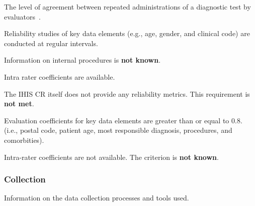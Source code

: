 The level of agreement between repeated administrations of a diagnostic test by evaluators~\cite{kilem2008}.

\begin{QandA}
    \item Reliability studies of key data elements (e.g., age, gender, and clinical code) are conducted at regular intervals.
    \begin{answered}
        Information on internal procedures is \textbf{not known}.
    \end{answered}

    \item Intra rater coefficients are available.
    \begin{answered}
        The IHIS CR itself does not provide any reliability metrics.
        This requirement is \textbf{not met}.
    \end{answered}

    \item Evaluation coefficients for key data elements are greater than or equal to 0.8. (i.e., postal code, patient age, most responsible diagnosis, procedures, and comorbities).
    \begin{answered}
        Intra-rater coefficients are not available.
        The criterion is \textbf{not known}.
    \end{answered}

\end{QandA}

\subsubsection{Collection}

Information on the data collection processes and tools used.

